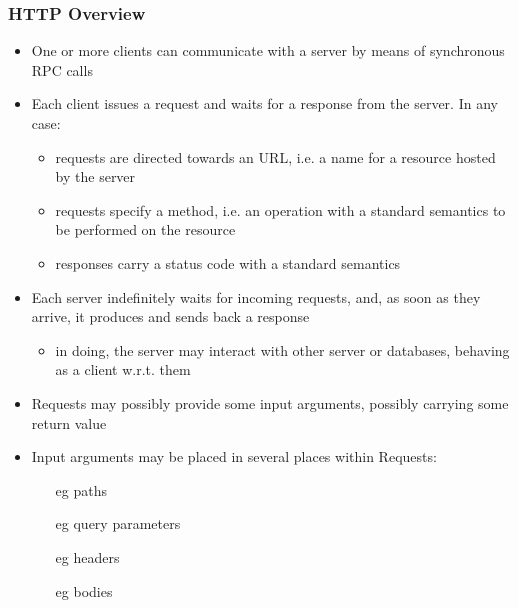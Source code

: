 \documentclass[presentation]{beamer}\mode<presentation>{\usetheme{AMSBolognaFC}}
\begin{document}
\begin{frame}[allowframebreaks]
\frametitle{HTTP Overview}

    \begin{itemize}
        \item One or more \alert{clients} can communicate with a server by means of \alert{synchronous} RPC calls

        \vspace{.3cm}

        \item Each client issues a \alert{request} and waits for a \alert{response} from the server. In any case:
        \begin{itemize}
            \item requests are directed towards an \alert{URL}, i.e. a name for a resource hosted by the server

            \item requests specify a \alert{method}, i.e. an operation with a standard semantics to be performed on the resource

            \item responses carry a \alert{status code} with a standard semantics
        \end{itemize}

        \vspace{.3cm}

        \item Each server indefinitely \alert{waits} for incoming requests, and, as soon as they arrive, it produces and sends back a response
        \begin{itemize}
            \item in doing, the server may interact with other server or \alert{databases}, behaving as a client w.r.t. them

        \end{itemize}

        \vspace{.3cm}

        \item Requests may possibly provide some \alert{input arguments}, possibly carrying some \alert{return value}

        \vspace{.3cm}

        \item \alert{Input arguments} may be placed in several places within \alert{Requests}:
        \begin{itemize}
            \item[eg] paths
            \item[eg] query parameters
            \item[eg] headers
            \item[eg] bodies
        \end{itemize}


\end{itemize}
\end{frame}
\end{document}
